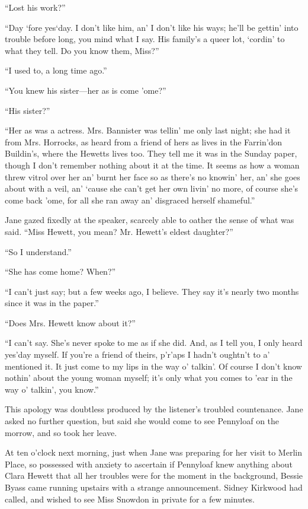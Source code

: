 ``Lost his work?''

``Day `fore yes`day. I don't like him, an' I don't like his ways; he'll
be gettin' into trouble before long, you mind what I say. His family's a
queer lot, `cordin' to what they tell. Do you know them, Miss?''

``I used to, a long time ago.''

``You knew his sister---her as is come 'ome?''

``His sister?''

``Her as was a actress. Mrs. Bannister was tellin' me only last night;
she had it from Mrs. Horrocks, as heard from a friend of hers as lives
in the Farrin'don Buildin's, where the Hewetts lives too. They tell me
it was in the Sunday paper, though I don't remember nothing about it at
the time. It seems as how a woman threw vitrol over her an' burnt her
face so as there's no knowin' her, an' she goes about with a veil, an'
`cause she can't get her {\protect\hypertarget{147}{}{}}own livin' no
more, of course she's come back 'ome, for all she ran away an' disgraced
herself shameful.''

Jane gazed fixedly at the speaker, scarcely able to oather the sense of
what was said. ``Miss Hewett, you mean? Mr. Hewett's eldest daughter?''

``So I understand.''

``She has come home? When?''

``I can't just say; but a few weeks ago, I believe. They say it's nearly
two months since it was in the paper.''

``Does Mrs. Hewett know about it?''

``I can't say. She's never spoke to me as if she did. And, as I tell
you, I only heard yes'day myself. If you're a friend of theirs, p'r'aps
I hadn't oughtn't to a' mentioned it. It just come to my lips in the way
o' talkin'. Of course I don't know nothin' about the young woman myself;
it's only what you comes to 'ear in the way o' talkin', you know.''

This apology was doubtless produced by the listener's troubled
countenance. Jane asked no further question, but said she would come to
see Pennyloaf on the morrow, and so took her leave.

{\protect\hypertarget{148}{}{}}At ten o'clock next morning, just when
Jane was preparing for her visit to Merlin Place, so possessed with
anxiety to ascertain if Pennyloaf knew anything about Clara Hewett that
all her troubles were for the moment in the background, Bessie Byass
came running upstairs with a strange announcement. Sidney Kirkwood had
called, and wished to see Miss Snowdon in private for a few minutes.

